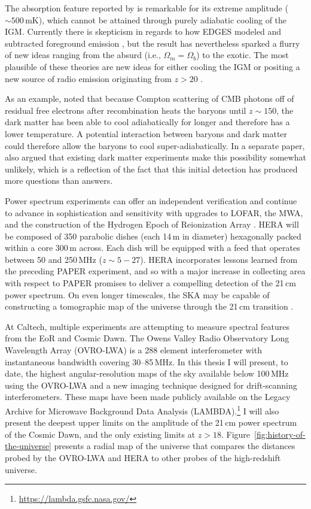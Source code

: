 \begin{bibunit}
The absorption feature reported by \citet{2018Natur.555...67B} is remarkable for its extreme
amplitude ($\sim 500\,\text{mK}$), which cannot be attained through purely adiabatic cooling of the
IGM.  Currently there is skepticism in regards to how EDGES modeled and subtracted foreground
emission \citep{2018arXiv180501421H}, but the result has nevertheless sparked a flurry of new ideas
ranging from the absurd (i.e., $\Omega_m = \Omega_b$) to the exotic.  The most plausible of these
theories are new ideas for either cooling the IGM \citep[e.g.,][]{2018Natur.555...71B} or positing a
new source of radio emission originating from $z > 20$ \citep[e.g.,][]{2018arXiv180301815E}.

As an example, \citet{2018Natur.555...71B} noted that because Compton scattering of CMB photons off
of residual free electrons after recombination heats the baryons until $z\sim 150$, the dark matter
has been able to cool adiabatically for longer and therefore has a lower temperature. A potential
interaction between baryons and dark matter could therefore allow the baryons to cool
super-adiabatically. In a separate paper, \citet{2018arXiv180303091B} also argued that existing dark
matter experiments make this possibility somewhat unlikely, which is a reflection of the fact that
this initial detection has produced more questions than answers.

Power spectrum experiments can offer an independent verification and continue to advance in
sophistication and sensitivity with upgrades to LOFAR, the MWA, and the construction of the Hydrogen
Epoch of Reionization Array \citep[HERA;][]{2017PASP..129d5001D}. HERA will be composed of 350
parabolic dishes (each 14\,m in diameter) hexagonally packed within a core 300\,m across.  Each dish
will be equipped with a feed that operates between 50 and 250\,MHz ($z\sim5-27$). HERA incorporates
lessons learned from the preceding PAPER experiment, and so with a major increase in collecting area
with respect to PAPER promises to deliver a compelling detection of the 21\,cm power spectrum.
On even longer timescales, the SKA may be capable of constructing a tomographic map of the universe
through the 21\,cm transition \citep{2013ExA....36..235M}.

At Caltech, multiple experiments are attempting to measure spectral features from the EoR and Cosmic
Dawn. The Owens Valley Radio Observatory Long Wavelength Array (OVRO-LWA) is a 288 element
interferometer with instantaneous bandwidth covering 30--85\,MHz. In this thesis I will present, to
date, the highest angular-resolution maps of the sky available below 100\,MHz using the OVRO-LWA and
a new imaging technique designed for drift-scanning interferometers. These maps have been made
publicly available on the Legacy Archive for Microwave Background Data Analysis (LAMBDA).\footnote{
    \url{https://lambda.gsfc.nasa.gov/}
}
I will also present the deepest upper limits on the amplitude of the 21\,cm power spectrum of the
Cosmic Dawn, and the only existing limits at $z > 18$. Figure~\ref{fig:history-of-the-universe}
presents a radial map of the universe that compares the distances probed by the OVRO-LWA and HERA to
other probes of the high-redshift universe.


\end{bibunit}

